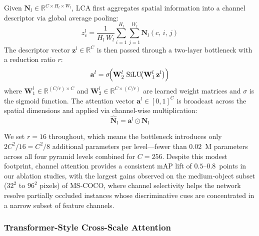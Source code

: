 Given $\mathbf{N}_{l} \in \mathbb{R}^{C \times H_l \times
W_l}$, LCA first aggregates spatial information into a channel
descriptor via global average pooling:
\begin{equation}
    z_{c}^{l} = \frac{1}{H_l \, W_l}
    \sum_{i=1}^{H_l}\sum_{j=1}^{W_l}
    \mathbf{N}_{l}(c,\,i,\,j)
    \label{eq:lca_gap}
\end{equation}
The descriptor vector
$\mathbf{z}^{l} \in \mathbb{R}^{C}$ is then passed through a
two-layer bottleneck with a reduction ratio $r$:
\begin{equation}
    \mathbf{a}^{l} = \sigma\!\Bigl(
        \mathbf{W}_{2}^{l}\;\text{SiLU}\!\bigl(
            \mathbf{W}_{1}^{l}\,\mathbf{z}^{l}
        \bigr)
    \Bigr)
    \label{eq:lca_gate}
\end{equation}
where $\mathbf{W}_{1}^{l} \in \mathbb{R}^{(C/r) \times C}$
and $\mathbf{W}_{2}^{l} \in \mathbb{R}^{C \times (C/r)}$ are
learned weight matrices and $\sigma$ is the sigmoid function.
The attention vector $\mathbf{a}^{l} \in [0,1]^{C}$ is
broadcast across the spatial dimensions and applied via
channel-wise multiplication:
\begin{equation}
    \hat{\mathbf{N}}_{l} = \mathbf{a}^{l} \odot \mathbf{N}_{l}
    \label{eq:lca_apply}
\end{equation}

We set $r = 16$ throughout, which means the bottleneck
introduces only $2C^{2}/16 = C^{2}/8$ additional parameters per
level---fewer than $0.02$~M parameters across all four pyramid
levels combined for $C = 256$. Despite this modest footprint,
channel attention provides a consistent mAP lift of
$0.5$--$0.8$~points in our ablation studies, with the largest
gains observed on the medium-object subset ($32^{2}$ to
$96^{2}$ pixels) of MS-COCO, where channel selectivity helps
the network resolve partially occluded instances whose
discriminative cues are concentrated in a narrow subset of
feature channels.

\subsubsection{Transformer-Style Cross-Scale Attention}

